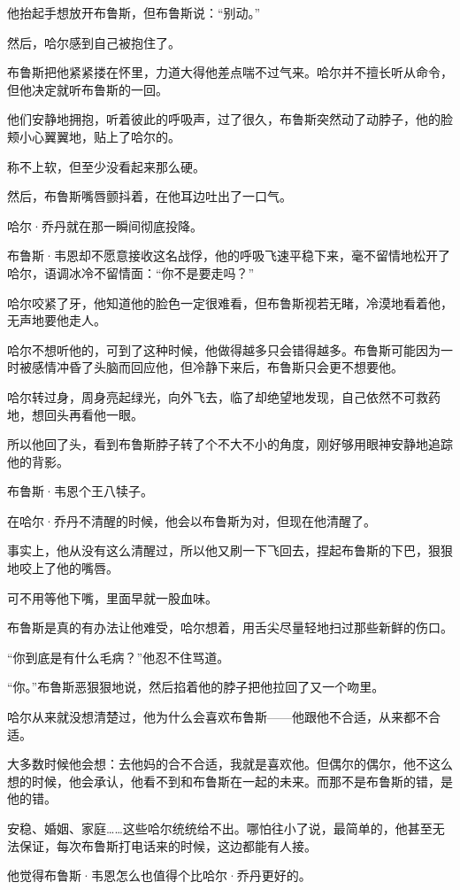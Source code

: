 \documentclass[../main]{subfiles}
\begin{document}
他抬起手想放开布鲁斯，但布鲁斯说：“别动。”

然后，哈尔感到自己被抱住了。

布鲁斯把他紧紧搂在怀里，力道大得他差点喘不过气来。哈尔并不擅长听从命令，但他决定就听布鲁斯的一回。

他们安静地拥抱，听着彼此的呼吸声，过了很久，布鲁斯突然动了动脖子，他的脸颊小心翼翼地，贴上了哈尔的。

称不上软，但至少没看起来那么硬。

然后，布鲁斯嘴唇颤抖着，在他耳边吐出了一口气。

哈尔·乔丹就在那一瞬间彻底投降。

布鲁斯·韦恩却不愿意接收这名战俘，他的呼吸飞速平稳下来，毫不留情地松开了哈尔，语调冰冷不留情面：“你不是要走吗？”

哈尔咬紧了牙，他知道他的脸色一定很难看，但布鲁斯视若无睹，冷漠地看着他，无声地要他走人。

哈尔不想听他的，可到了这种时候，他做得越多只会错得越多。布鲁斯可能因为一时被感情冲昏了头脑而回应他，但冷静下来后，布鲁斯只会更不想要他。

哈尔转过身，周身亮起绿光，向外飞去，临了却绝望地发现，自己依然不可救药地，想回头再看他一眼。

所以他回了头，看到布鲁斯脖子转了个不大不小的角度，刚好够用眼神安静地追踪他的背影。

布鲁斯·韦恩个王八犊子。

在哈尔·乔丹不清醒的时候，他会以布鲁斯为对，但现在他清醒了。

事实上，他从没有这么清醒过，所以他又刷一下飞回去，捏起布鲁斯的下巴，狠狠地咬上了他的嘴唇。

可不用等他下嘴，里面早就一股血味。

布鲁斯是真的有办法让他难受，哈尔想着，用舌尖尽量轻地扫过那些新鲜的伤口。

“你到底是有什么毛病？”他忍不住骂道。

“你。”布鲁斯恶狠狠地说，然后掐着他的脖子把他拉回了又一个吻里。

哈尔从来就没想清楚过，他为什么会喜欢布鲁斯——他跟他不合适，从来都不合适。

大多数时候他会想：去他妈的合不合适，我就是喜欢他。但偶尔的偶尔，他不这么想的时候，他会承认，他看不到和布鲁斯在一起的未来。而那不是布鲁斯的错，是他的错。

安稳、婚姻、家庭……这些哈尔统统给不出。哪怕往小了说，最简单的，他甚至无法保证，每次布鲁斯打电话来的时候，这边都能有人接。

他觉得布鲁斯·韦恩怎么也值得个比哈尔·乔丹更好的。
\end{document}
